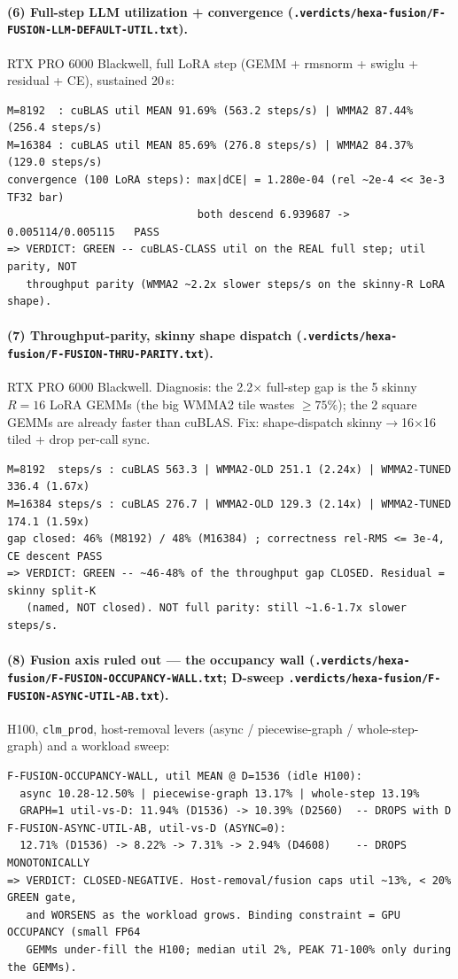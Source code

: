 \documentclass[11pt,a4paper]{article}
\newcommand{\vd}[1]{\texttt{.verdicts/hexa-fusion/#1.txt}}
\begin{document}
\paragraph{(6) Full-step LLM utilization + convergence
(\vd{F-FUSION-LLM-DEFAULT-UTIL}).}
RTX PRO 6000 Blackwell, full LoRA step (GEMM + rmsnorm + swiglu + residual + CE),
sustained 20\,s:
\begin{lstlisting}[basicstyle=\ttfamily\footnotesize,frame=single,xleftmargin=0pt]
M=8192  : cuBLAS util MEAN 91.69% (563.2 steps/s) | WMMA2 87.44% (256.4 steps/s)
M=16384 : cuBLAS util MEAN 85.69% (276.8 steps/s) | WMMA2 84.37% (129.0 steps/s)
convergence (100 LoRA steps): max|dCE| = 1.280e-04 (rel ~2e-4 << 3e-3 TF32 bar)
                              both descend 6.939687 -> 0.005114/0.005115   PASS
=> VERDICT: GREEN -- cuBLAS-CLASS util on the REAL full step; util parity, NOT
   throughput parity (WMMA2 ~2.2x slower steps/s on the skinny-R LoRA shape).
\end{lstlisting}

\paragraph{(7) Throughput-parity, skinny shape dispatch
(\vd{F-FUSION-THRU-PARITY}).}
RTX PRO 6000 Blackwell. Diagnosis: the 2.2$\times$ full-step gap is the 5 skinny
$R{=}16$ LoRA GEMMs (the big WMMA2 tile wastes $\geq75\%$); the 2 square GEMMs are
already faster than cuBLAS. Fix: shape-dispatch skinny$\to$16$\times$16 tiled +
drop per-call sync.
\begin{lstlisting}[basicstyle=\ttfamily\footnotesize,frame=single,xleftmargin=0pt]
M=8192  steps/s : cuBLAS 563.3 | WMMA2-OLD 251.1 (2.24x) | WMMA2-TUNED 336.4 (1.67x)
M=16384 steps/s : cuBLAS 276.7 | WMMA2-OLD 129.3 (2.14x) | WMMA2-TUNED 174.1 (1.59x)
gap closed: 46% (M8192) / 48% (M16384) ; correctness rel-RMS <= 3e-4, CE descent PASS
=> VERDICT: GREEN -- ~46-48% of the throughput gap CLOSED. Residual = skinny split-K
   (named, NOT closed). NOT full parity: still ~1.6-1.7x slower steps/s.
\end{lstlisting}

\paragraph{(8) Fusion axis ruled out --- the occupancy wall
(\vd{F-FUSION-OCCUPANCY-WALL}; D-sweep \vd{F-FUSION-ASYNC-UTIL-AB}).}
H100, \texttt{clm\_prod}, host-removal levers (async / piecewise-graph /
whole-step-graph) and a workload sweep:
\begin{lstlisting}[basicstyle=\ttfamily\footnotesize,frame=single,xleftmargin=0pt]
F-FUSION-OCCUPANCY-WALL, util MEAN @ D=1536 (idle H100):
  async 10.28-12.50% | piecewise-graph 13.17% | whole-step 13.19%
  GRAPH=1 util-vs-D: 11.94% (D1536) -> 10.39% (D2560)  -- DROPS with D
F-FUSION-ASYNC-UTIL-AB, util-vs-D (ASYNC=0):
  12.71% (D1536) -> 8.22% -> 7.31% -> 2.94% (D4608)    -- DROPS MONOTONICALLY
=> VERDICT: CLOSED-NEGATIVE. Host-removal/fusion caps util ~13%, < 20% GREEN gate,
   and WORSENS as the workload grows. Binding constraint = GPU OCCUPANCY (small FP64
   GEMMs under-fill the H100; median util 2%, PEAK 71-100% only during the GEMMs).
\end{lstlisting}
\end{document}
